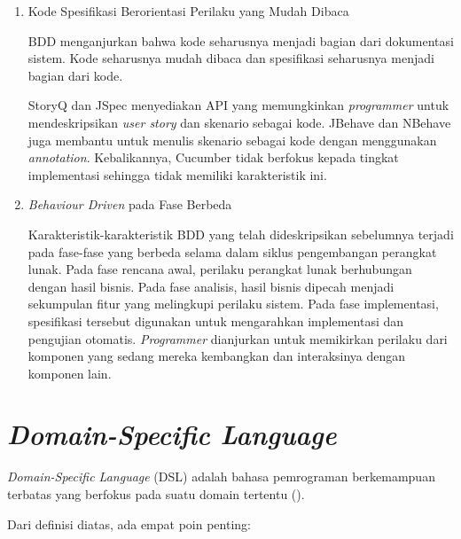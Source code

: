 \begin{enumerate}
  \item Kode Spesifikasi Berorientasi Perilaku yang Mudah Dibaca

        BDD menganjurkan bahwa kode seharusnya menjadi bagian dari dokumentasi sistem. Kode seharusnya
        mudah dibaca dan spesifikasi seharusnya menjadi bagian dari kode.

        StoryQ dan JSpec menyediakan API yang memungkinkan \emph{programmer} untuk mendeskripsikan
        \emph{user story} dan skenario sebagai kode. JBehave dan NBehave juga membantu untuk menulis
        skenario sebagai kode dengan menggunakan \emph{annotation}. Kebalikannya, Cucumber tidak
        berfokus kepada tingkat implementasi sehingga tidak memiliki karakteristik ini.

  \item \emph{Behaviour Driven} pada Fase Berbeda

        Karakteristik-karakteristik BDD yang telah dideskripsikan sebelumnya terjadi
        pada fase-fase yang berbeda selama dalam siklus pengembangan perangkat lunak.
        Pada fase rencana awal, perilaku perangkat lunak berhubungan dengan hasil bisnis.
        Pada fase analisis, hasil bisnis dipecah menjadi sekumpulan fitur yang melingkupi
        perilaku sistem.
        Pada fase implementasi, spesifikasi tersebut digunakan untuk mengarahkan implementasi
        dan pengujian otomatis. \emph{Programmer} dianjurkan untuk memikirkan perilaku dari
        komponen yang sedang mereka kembangkan dan interaksinya dengan komponen lain.

\end{enumerate}




\section{\emph{Domain-Specific Language}}

\emph{Domain-Specific Language} (DSL) adalah bahasa pemrograman berkemampuan terbatas yang
berfokus pada suatu domain tertentu (\cite{fowler_dsl}).

Dari definisi diatas, ada empat poin penting:

